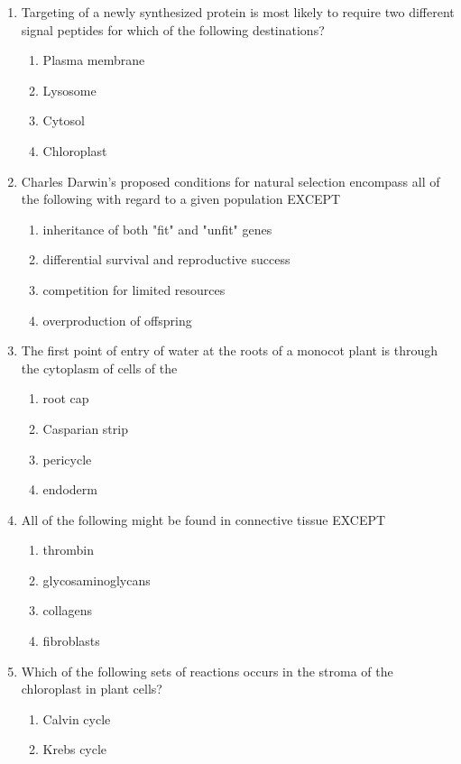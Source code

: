 \documentclass[12pt]{article}
\begin{document}
\begin{enumerate}[label=\arabic*.]
\begin{enumerate}[label=(\alph*)]
\end{enumerate}
\item Targeting of a newly synthesized protein is most likely to require two different signal peptides for which of the following destinations?
\begin{enumerate}[label=(\alph*)]
    \item Plasma membrane
    \item Lysosome
    \item Cytosol
    \item Chloroplast
\end{enumerate}
\item Charles Darwin's proposed conditions for natural selection encompass all of the following with regard to a given population EXCEPT
\begin{enumerate}[label=(\alph*)]
    \item inheritance of both "fit" and "unfit" genes
    \item differential survival and reproductive success
    \item competition for limited resources
    \item overproduction of offspring
\end{enumerate}
\item The first point of entry of water at the roots of a monocot plant is through the cytoplasm of cells of the
\begin{enumerate}[label=(\alph*)]
    \item root cap
    \item Casparian strip
    \item pericycle
    \item endoderm
\end{enumerate}
\item All of the following might be found in connective tissue EXCEPT
\begin{enumerate}[label=(\alph*)]
    \item thrombin
    \item glycosaminoglycans
    \item collagens
    \item fibroblasts
\end{enumerate}
\item Which of the following sets of reactions occurs in the stroma of the chloroplast in plant cells?
\begin{enumerate}[label=(\alph*)]
    \item Calvin cycle
    \item Krebs cycle

\end{enumerate}
\end{enumerate}
\end{document}
